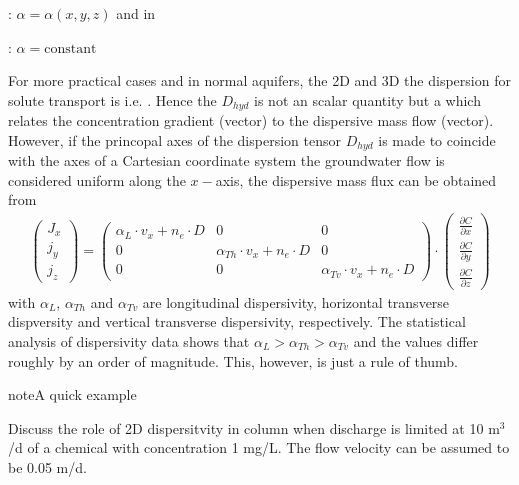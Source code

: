 \documentclass[letterpaper,10pt,english]{jupyterBook}
\begin{document}
\sphinxAtStartPar
{}: \(\alpha = \alpha(x,y,z)\) and in

\sphinxAtStartPar
{}: \(\alpha = \text{constant}\)

\sphinxAtStartPar
For more practical cases and in normal aquifers, the 2\sphinxhyphen{}D and 3\sphinxhyphen{}D the dispersion for solute transport is  i.e. . Hence the \(D_{hyd}\) is not an scalar quantity but a  which relates the concentration gradient (vector) to the dispersive mass flow (vector). However, if the princopal axes of the dispersion tensor \(D_{hyd}\) is made to coincide with the axes of a Cartesian coordinate system  the groundwater flow is considered uniform along the \(x-\)axis, the dispersive mass flux can be obtained from
\begin{equation*}
\begin{split}
\begin{pmatrix} J_x \\ j_y \\ j_z \end{pmatrix} =
\begin{pmatrix} \alpha_L \cdot v_x + n_e \cdot D & 0 & 0 \\
0 & \alpha_{Th} \cdot v_x + n_e \cdot D & 0\\
0 & 0 & \alpha_{Tv} \cdot v_x + n_e \cdot D
\end{pmatrix}
\cdot
\begin{pmatrix} \frac{\partial C}{\partial x} \\ \frac{\partial C}{\partial y} \\ \frac{\partial C}{\partial z} \end{pmatrix} 
\end{split}
\end{equation*}
\sphinxAtStartPar
with \(\alpha_L\), \(\alpha_{Th}\) and \(\alpha_{Tv}\) are longitudinal dispersivity, horizontal transverse dispversity and vertical transverse dispersivity, respectively. The statistical analysis of dispersivity data shows that \(\alpha_{L}>\alpha_{Th}>\alpha_{Tv}\) and the values differ roughly by an order of magnitude. This, however, is just a rule of thumb.

\begin{sphinxadmonition}{note}{A quick example}

\sphinxAtStartPar
Discuss the role of 2D dispersitvity in  column when discharge is limited at 10 m\(^3\)/d of a chemical with concentration 1 mg/L. The flow velocity can be assumed to be 0.05 m/d.
\end{sphinxadmonition}
\end{document}
